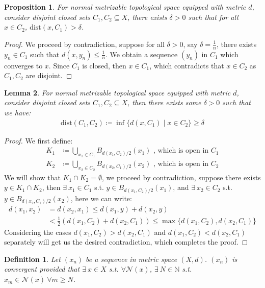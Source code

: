 \documentclass[11pt]{book}
\theoremstyle{break}
\theoremstyle{break}
\newtheorem{lem}{Lemma}[thm]
\newtheorem{prop}[lem]{Proposition}
\newtheorem{defn}{Definition}[corL]
\newcommand{\N}{\mathbb{N}}
\begin{document}
\begin{prop}
For normal metrizable topological space equipped with metric $d$, consider disjoint closed sets $C_1,C_2 \subseteq X$, there exists $\delta>0$ such that for all $x \in C_2$, $\text{dist}(x,C_1)> \delta$. 
\end{prop}
\begin{proof}
We proceed by contradiction, suppose for all $\delta>0$, say $\delta = \frac{1}{n}$, there exists $y_n \in C_1$ such that $d(x,y_n) \leq \frac{1}{n}$. We obtain a sequence $(y_n)$ in $C_1$ which converges to $x$. Since $C_1$ is closed, then $x \in C_1$, which contradicts that $x \in C_2$ as $C_1,C_2$ are disjoint.
\end{proof}

\begin{lem}
For normal metrizable topological space equipped with metric $d$, consider disjoint closed sets $C_1,C_2 \subseteq X$, then there exists some $\delta>0$ such that we have:
\begin{align*}
\text{dist}(C_1,C_2) \coloneqq \inf\{ d(x,C_1)\mid x \in C_2\} \geq \delta
\end{align*}
\end{lem}
\begin{proof}
We first define:
\begin{align*}
K_1 &\coloneqq \bigcup_{x_1 \in C_1}B_{d(x_1,C_2)/2}(x_1) \text{ , which is open in }C_1\\
K_2 &\coloneqq \bigcup_{x_2 \in C_2}B_{d(x_2,C_1)/2}(x_2) \text{ , which is open in }C_2
\end{align*}
We will show that $K_1 \cap K_2 = \emptyset$, we proceed by contradiction, suppose there exists $y \in K_1\cap K_2$, then $\exists\ x_1 \in C_1$ s.t. $y \in B_{d(x_1,C_2)/2}(x_1)$, and $\exists\ x_2 \in C_2$ s.t. $y \in B_{d(x_2,C_1)/2}(x_2)$, here we can write:
\begin{align*}
d(x_1,x_2) &= d(x_2,x_1) \leq d(x_1,y) + d(x_2,y) \\
&< \frac{1}{2}\left( d(x_1,C_2) + d(x_2,C_1)\right) \leq \max \{ d(x_1,C_2), d(x_2,C_1)\}
\end{align*}
Considering the cases $d(x_1,C_2) > d(x_2,C_1)$ and $d(x_1,C_2)< d(x_2,C_1)$ separately will get us the desired contradiction, which completes the proof.
\end{proof}

\begin{defn}
Let $(x_n)$ be a sequence in metric space $(X,d)$. $(x_n)$ is convergent provided that $\exists\ x \in X$ s.t. $\forall \mathcal{N}(x)$, $\exists\ N \in \N$ s.t. $x_m \in \mathcal{N}(x)\ \forall m \geq N$.  
\end{defn}
\end{document}
